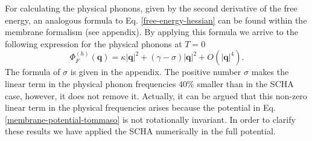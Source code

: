 For calculating the physical phonons, given by the second derivative of the free energy, an analogous formula to 
Eq. \ref{free-energy-hessian} can be found within the membrane formalism (see appendix). By applying this formula 
we arrive to the following expression for the physical phonons at $T=0$
\begin{equation}
 \Phi_{F}^{(h)}(\boldsymbol{q})=\kappa|\boldsymbol{q}|^{2}+(\gamma-\sigma)|\boldsymbol{q}|^{2}+
 O(|\boldsymbol{q}|^{4}).
\end{equation} 
The formula of $\sigma$ is given in the appendix. The positive number $\sigma$ makes the linear term in the physical 
phonon frequencies $40\%$ smaller than in the SCHA case, however, it does not remove it. Actually, it can be argued 
that this non-zero linear term in the physical frequencies arises because the potential in 
Eq. \ref{membrane-potential-tommaso} is not rotationally invariant. In order to clarify these results we have 
applied the SCHA numerically in the full potential. \\

